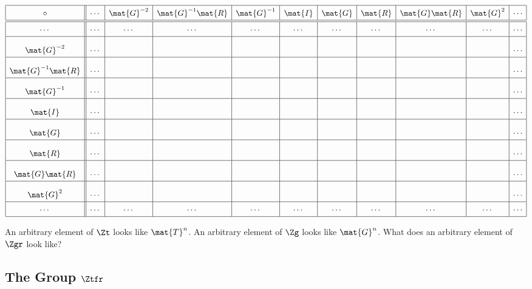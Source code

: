 \[
{
\renewcommand{\arraystretch}{1.5}
\begin{array}{| c || c | c | c | c | c | c | c | c | c | c|}
\hline
\circ & \cdots & \mat{G}^{-2} & \mat{G}^{-1}\mat{R}  & \mat{G}^{-1} & \mat{I} & \mat{G} &  \mat{R} & \mat{G} \mat{R} & \mat{G}^2  & \cdots \\ \hline \hline
\cdots &\cdots & \cdots & \cdots  & \cdots & \cdots &  \cdots  & \cdots & \cdots &  \cdots &  \cdots\\ \hline
\mat{G}^{-2} & \cdots &\rule[7mm]{13mm}{0mm} &\rule[7mm]{13mm}{0mm} &\rule[7mm]{13mm}{0mm} &\rule[7mm]{13mm}{0mm}  &\rule[7mm]{13mm}{0mm} &\rule[7mm]{13mm}{0mm} &\rule[7mm]{13mm}{0mm} &  \rule[7mm]{13mm}{0mm} &  \cdots\\ \hline
\mat{G}^{-1} \mat{R} & \cdots &\rule[7mm]{13mm}{0mm} & & & & & & & & \cdots \\ \hline
\mat{G}^{-1} & \cdots &\rule[7mm]{13mm}{0mm} & & & & & & & & \cdots \\ \hline
\mat{I} & \cdots &\rule[7mm]{13mm}{0mm} & & & & & & & &\cdots \\ \hline
\mat{G} & \cdots &\rule[7mm]{13mm}{0mm} & & & & & & & & \cdots \\ \hline
\mat{R} & \cdots &\rule[7mm]{13mm}{0mm} & & & & & & & & \cdots \\ \hline
\mat{G} \mat{R} & \cdots &\rule[7mm]{13mm}{0mm} & & & & & & & & \cdots \\ \hline
\mat{G}^2 & \cdots &\rule[7mm]{13mm}{0mm} & & & & & & & &\cdots \\ \hline
\cdots & \cdots & \cdots  &\cdots &\cdots &\cdots &\cdots & \cdots &\cdots &\cdots & \cdots \\ \hline
\end{array}}
\]


\begin{ques}
An arbitrary element of $\Zt$ looks like $\mat{T}^n$. An arbitrary
element of $\Zg$ looks like $\mat{G}^n$. What does an arbitrary element
of $\Zgr$ look like?
\end{ques}
\QM









\subsection*{The Group $\boldsymbol{\Ztfr}$}

